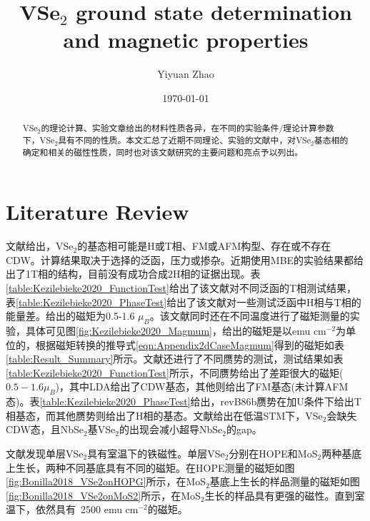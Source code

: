 \documentclass[reprint, aps, prb, showkeys]{revtex4-2}
\begin{document}
\title{VSe$_2$ ground state determination \\
and magnetic properties
}

\author{Yiyuan Zhao}
\date{\today}

\begin{abstract}
VSe$_2$的理论计算、实验文章给出的材料性质各异，在不同的实验条件/理论计算参数下，VSe$_2$具有不同的性质。本文汇总了近期不同理论、实验的文献中，对VSe$_2$基态相的确定和相关的磁性性质，同时也对该文献研究的主要问题和亮点予以列出。
\end{abstract}


\maketitle

\section{Literature Review}
文献\cite{Kezilebieke2020}给出，VSe$_2$的基态相可能是H或T相、FM或AFM构型、存在或不存在CDW。计算结果取决于选择的泛函，压力或掺杂。近期使用MBE的实验结果都给出了1T相的结构，目前没有成功合成2H相的证据出现。表\ref{table:Kezilebieke2020_FunctionTest}给出了该文献对不同泛函的T相测试结果，表\ref{table:Kezilebieke2020_PhaseTest}给出了该文献对一些测试泛函中H相与T相的能量差。给出的磁矩为0.5-1.6 $\mu_B$。该文献同时还在不同温度进行了磁矩测量的实验，具体可见图\ref{fig:Kezilebieke2020_Magmum}，给出的磁矩是以emu cm$^{-2}$为单位的，根据磁矩转换的推导式\ref{eqn:Appendix2dCaseMagmum}得到的磁矩如表\ref{table:Result_Summary}所示。文献还进行了不同赝势的测试，测试结果如表\ref{table:Kezilebieke2020_FunctionTest}所示，不同赝势给出了差距很大的磁矩($0.5-1.6 \mu_B$)，其中LDA给出了CDW基态，其他则给出了FM基态(未计算AFM态)。表\ref{table:Kezilebieke2020_PhaseTest}给出，revB86b赝势在加U条件下给出T相基态，而其他赝势则给出了H相的基态。文献给出在低温STM下，VSe$_2$会缺失CDW态，且NbSe$_2$基VSe$_2$的出现会减小超导NbSe$_2$的gap。

文献\cite{Bonilla2018}发现单层VSe$_2$具有室温下的铁磁性。单层VSe$_2$分别在HOPE和MoS$_2$两种基底上生长，两种不同基底具有不同的磁矩。在HOPE测量的磁矩如图\ref{fig:Bonilla2018_VSe2onHOPG}所示，在MoS$_2$基底上生长的样品测量的磁矩如图\ref{fig:Bonilla2018_VSe2onMoS2}所示，在MoS$_2$生长的样品具有更强的磁性。直到室温下，依然具有~2500 emu cm$^{-2}$的磁矩。
\end{document}
